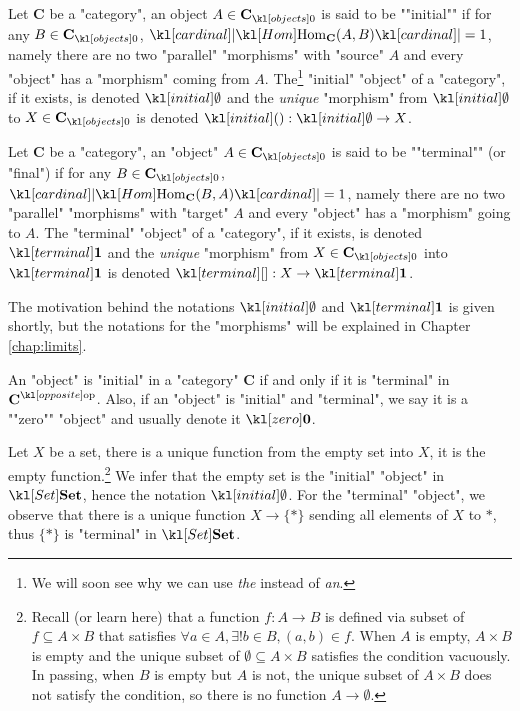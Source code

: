 \documentclass[main.tex]{subfiles}
\begin{document}
\begin{defn}
	\AP Let $\mathbf{C}$ be a "category", an object $A \in \obj{\mathbf{C}}$ is said to be ""initial"" if for any $B \in \obj{\mathbf{C}}$, $\cardinal{\Hom_{\mathbf{C}}(A,B)} = 1$, namely there are no two "parallel" "morphisms" with "source" $A$ and every "object" has a "morphism" coming from $A$. The\footnote{We will soon see why we can use \textit{the} instead of \textit{an}.} "initial" "object" of a "category", if it exists, is denoted $\initial$ and the \textit{unique} "morphism" from $\initial$ to $X\in \obj{\mathbf{C}}$ is denoted $\initmorph: \initial \rightarrow X$.
\end{defn}
\begin{defn}
	\AP Let $\mathbf{C}$ be a "category", an "object" $A \in \obj{\mathbf{C}}$ is said to be ""terminal"" (or "final") if for any $B \in \obj{\mathbf{C}}$, $\cardinal{\Hom_{\mathbf{C}}(B,A)} = 1$, namely there are no two "parallel" "morphisms" with "target" $A$ and every "object" has a "morphism" going to $A$. The "terminal" "object" of a "category", if it exists, is denoted $\terminal$ and the \textit{unique} "morphism" from $X \in \obj{\mathbf{C}}$ into $\terminal$ is denoted $\termmorph:X \rightarrow \terminal$.
\end{defn}
\begin{rem}[Notation]
	The motivation behind the notations $\initial$ and $\terminal$ is given shortly, but the notations for the "morphisms" will be explained in Chapter \ref{chap:limits}.
\end{rem}
An "object" is "initial" in a "category" $\mathbf{C}$ if and only if it is "terminal" in $\op{\mathbf{C}}$. \AP Also, if an "object" is "initial" and "terminal", we say it is a ""zero"" "object" and usually denote it $\zero$.
\begin{exmp}[$\catSet$]
	Let $X$ be a set, there is a unique function from the empty set into $X$, it is the empty function.\footnote{Recall (or learn here) that a function $f: A \rightarrow B$ is defined via subset of $f \subseteq A \times B$ that satisfies $\forall a \in A, \exists! b\in B, (a,b) \in f$. When $A$ is empty, $A \times B$ is empty and the unique subset of $\emptyset \subseteq A\times B$ satisfies the condition vacuously. In passing, when $B$ is empty but $A$ is not, the unique subset of $A \times B$ does not satisfy the condition, so there is no function $A \rightarrow \emptyset$.} We infer that the empty set is the "initial" "object" in $\catSet$, hence the notation $\initial$. For the "terminal" "object", we observe that there is a unique function $X \rightarrow \{\ast\}$ sending all elements of $X$ to $\ast$, thus $\{\ast\}$ is "terminal" in $\catSet$.
\end{exmp}
\end{document}
